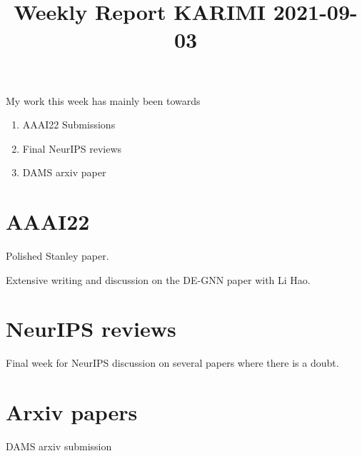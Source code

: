 \documentclass{article}
\begin{document}
\title{Weekly Report KARIMI 2021-09-03}


\date{}
\maketitle

\vspace{-0.5in}

My work this week has mainly been towards
\begin{enumerate}
\item AAAI22 Submissions
\item Final NeurIPS reviews
\item DAMS arxiv paper
\end{enumerate}


\section{AAAI22}
Polished Stanley paper.

Extensive writing and discussion on the DE-GNN paper with Li Hao.


\section{NeurIPS reviews}
Final week for NeurIPS discussion on several papers where there is a doubt.

\section{Arxiv papers}
DAMS arxiv submission







\end{document}
